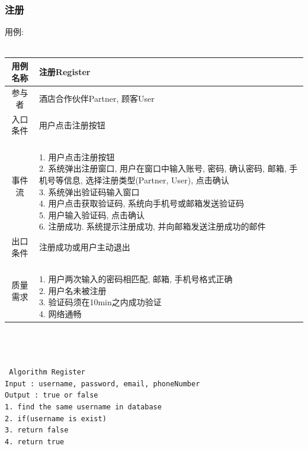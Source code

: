 \documentclass[11pt]{article}
\begin{document}
		\subsubsection{注册}
			用例: \\ \\
			\begin{tabular}{c|l}
			\hline
			用例名称 & 注册Register \\ \hline
			参与者 & 酒店合作伙伴Partner, 顾客User  \\ \hline
			入口条件 & 用户点击注册按钮 \\ \hline
			事件流 & 	\parbox{33em}{\ \\
						1. 用户点击注册按钮 \\
						2. 系统弹出注册窗口, 用户在窗口中输入账号, 密码, 确认密码, 邮箱, 手机号等信息, 选择注册类型(Partner, User), 点击确认  \\
						3. 系统弹出验证码输入窗口 \\
						4. 用户点击获取验证码, 系统向手机号或邮箱发送验证码 \\
						5. 用户输入验证码, 点击确认 \\
						6. 注册成功. 系统提示注册成功, 并向邮箱发送注册成功的邮件 \\
						} \\ \hline
			出口条件 & 注册成功或用户主动退出 \\ \hline
			质量需求 & \parbox{33em}{\ \\
						1. 用户两次输入的密码相匹配, 邮箱, 手机号格式正确 \\ 
						2. 用户名未被注册 \\
						3. 验证码须在10min之内成功验证 \\
						4. 网络通畅 \\
						} \\ \hline
			\end{tabular}\\ \\ \\
			\texttt{
			Algorithm Register \\
			Input : username, password, email, phoneNumber \\
			Output : true or false \\
			1. find the same username in database \\
			2. if(username is exist) \\
			3.     return false \\
			4. return true \\
			} \\
			
\end{document}
